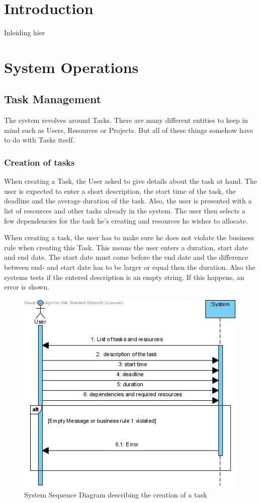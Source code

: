 \documentclass[a4paper,11pt]{article}
\begin{document}
	\section{Introduction}
		Inleiding hier
	\section{System Operations}
		\subsection{Task Management}
			The system revolves around Tasks. There are many different entities to keep in mind such as Users, Resources or Projects.
			But all of these things somehow have to do with Tasks itself.
			\subsubsection{Creation of tasks}
				When creating a Task, the User asked to give details about the task at hand. The user is expected to enter a short description, the start time of the task, the deadline and the average duration of the task.
				Also, the user is presented with a list of resources and other tasks already in the system. The user then selects a few dependencies for the task he's creating and resources he wishes to allocate.

				When creating a task, the user has to make sure he does not violate the business rule when creating this Task. This means the user enters a duration, start date and end date. The start date must come before the end date and the difference between end- and start date has to be larger or equal then the duration. Also the systems tests if the entered description is an empty string. If this happens, an error is shown.\\
				\begin{figure}[h!]
					\begin{center}
						\includegraphics[scale=0.5]{images/ssd_create_task.jpg}
					\end{center}
					\caption{System Sequence Diagram describing the creation of a task}
				\end{figure}
\end{document}
